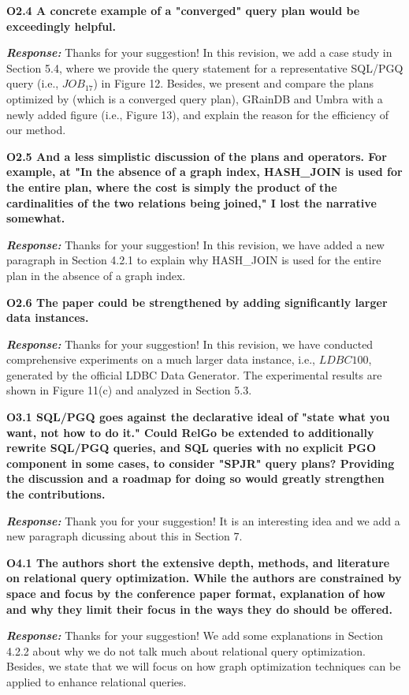 \textbf{
O2.4 A concrete example of a "converged" query plan would be exceedingly helpful.} 

\textbf{\textit{Response: }} 
Thanks for your suggestion! 
In this revision, we add a case study in Section 5.4, where we provide the query statement for a representative SQL/PGQ query (i.e., $JOB_{17}$) in Figure 12.
Besides, we present and compare the plans optimized by \name (which is a converged query plan), GRainDB and Umbra with a newly added figure (i.e., Figure 13), and explain the reason for the efficiency of our method.

\textbf{
O2.5 And a less simplistic discussion of the plans and operators. For example, at "In the absence of a graph index, HASH\_JOIN is used for the entire plan, where the cost is simply the product of the cardinalities of the two relations being joined," I lost the narrative somewhat. }

\textbf{\textit{Response: }}
Thanks for your suggestion! 
In this revision, we have added a new paragraph in Section 4.2.1 to explain why HASH\_JOIN is used for the entire plan in the absence of a graph index.


\textbf{
O2.6 The paper could be strengthened by adding significantly larger data instances.}

\textbf{\textit{Response: }}
Thanks for your suggestion! In this revision, we have conducted comprehensive experiments on a much larger data instance, i.e., $LDBC100$, generated by the official LDBC Data Generator.
The experimental results are shown in Figure 11(c) and analyzed in Section 5.3.


\textbf{O3.1 SQL/PGQ goes against the declarative ideal of "state what you want, not how to do it." 
Could RelGo be extended to additionally rewrite SQL/PGQ queries, and SQL queries with no explicit PGO component in some cases, to consider "SPJR" query plans? 
Providing the discussion and a roadmap for doing so would greatly strengthen the contributions.}

\textbf{\textit{Response: }}
Thank you for your suggestion! 
It is an interesting idea and we add a new paragraph dicussing about this in Section 7.

\textbf{O4.1 The authors short the extensive depth, methods, and literature on relational query optimization. While the authors are constrained by space and focus by the conference paper format, explanation of how and why they limit their focus in the ways they do should be offered. }

\textbf{\textit{Response: }}
Thanks for your suggestion! 
We add some explanations in Section 4.2.2 about why we do not talk much about relational query optimization.
Besides, we state that we will focus on how graph optimization techniques can be applied to enhance relational queries.


